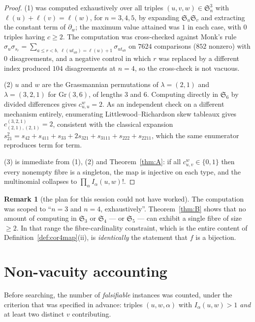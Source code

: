 \documentclass[11pt]{article}
\theoremstyle{plain}
\theoremstyle{definition}
\newtheorem{remark}[theorem]{Remark}
\newcommand{\Sn}{\mathfrak{S}_n}
\begin{document}
\begin{proof}
(1) was computed exhaustively over all triples $(u,v,w)\in\Sn^3$ with
$\ell(u)+\ell(v)=\ell(w)$, for $n=3,4,5$, by expanding $\mathfrak{S}_u\mathfrak{S}_v$
and extracting the constant term of $\partial_w$; the maximum value attained was
$1$ in each case, with $0$ triples having $c\ge2$.  The computation was
cross-checked against Monk's rule
$\sigma_u\sigma_{s_r}=\sum_{a\le r<b,\;\ell(ut_{ab})=\ell(u)+1}\sigma_{ut_{ab}}$
on $7624$ comparisons ($852$ nonzero) with $0$ disagreements, and a negative
control in which $r$ was replaced by a different index produced $104$
disagreements at $n=4$, so the cross-check is not vacuous.

(2) $u$ and $w$ are the Grassmannian permutations of $\lambda=(2,1)$ and
$\lambda=(3,2,1)$ for $\mathrm{Gr}(3,6)$, of lengths $3$ and $6$.  Computing
directly in $\mathfrak{S}_6$ by divided differences gives $c^w_{u,u}=2$.  As an
independent check on a different mechanism entirely, enumerating
Littlewood--Richardson skew tableaux gives
$c^{(3,2,1)}_{(2,1),(2,1)}=2$, consistent with the classical expansion
$s_{21}^2=s_{42}+s_{411}+s_{33}+2s_{321}+s_{3111}+s_{222}+s_{2211}$, which the
same enumerator reproduces term for term.

(3) is immediate from (1), (2) and Theorem~\ref{thm:A}: if all $c^w_{u,v}\in\{0,1\}$
then every nonempty fibre is a singleton, the map is injective on each type, and
the multinomial collapses to $\prod_\alpha I_\alpha(u,w)!$.
\end{proof}

\begin{remark}[the plan for this session could not have worked]
The computation was scoped to ``$n=3$ and $n=4$, exhaustively''.
Theorem~\ref{thm:B} shows that no amount of computing in $\mathfrak{S}_3$ or
$\mathfrak{S}_4$ --- or $\mathfrak{S}_5$ --- can exhibit a single fibre of size
$\ge2$.  In that range the fibre-cardinality constraint, which is the entire
content of Definition~\ref{def:cor4map}(ii), is \emph{identically} the statement
that $f$ is a bijection.
\end{remark}

\section{Non-vacuity accounting}

Before searching, the number of \emph{falsifiable} instances was counted, under
the criterion that was specified in advance: triples $(u,w,\alpha)$ with
$I_\alpha(u,w)>1$ \emph{and} at least two distinct $v$ contributing.
\end{document}
